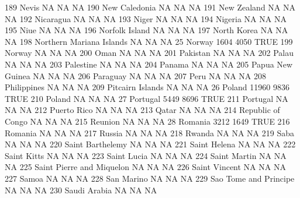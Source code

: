 \documentclass [a4paper] {article}
\begin{document}
\begin{Schunk}
\begin{Soutput}
189                               Nevis    NA    NA   NA
190                       New Caledonia    NA    NA   NA
191                         New Zealand    NA    NA   NA
192                           Nicaragua    NA    NA   NA
193                               Niger    NA    NA   NA
194                             Nigeria    NA    NA   NA
195                                Niue    NA    NA   NA
196                      Norfolk Island    NA    NA   NA
197                         North Korea    NA    NA   NA
198            Northern Mariana Islands    NA    NA   NA
25                               Norway  1604  4050 TRUE
199                              Norway    NA    NA   NA
200                                Oman    NA    NA   NA
201                            Pakistan    NA    NA   NA
202                               Palau    NA    NA   NA
203                           Palestine    NA    NA   NA
204                              Panama    NA    NA   NA
205                    Papua New Guinea    NA    NA   NA
206                            Paraguay    NA    NA   NA
207                                Peru    NA    NA   NA
208                         Philippines    NA    NA   NA
209                    Pitcairn Islands    NA    NA   NA
26                               Poland 11960  9836 TRUE
210                              Poland    NA    NA   NA
27                             Portugal  5449  8696 TRUE
211                            Portugal    NA    NA   NA
212                         Puerto Rico    NA    NA   NA
213                               Qatar    NA    NA   NA
214                   Republic of Congo    NA    NA   NA
215                             Reunion    NA    NA   NA
28                              Romania  3212  1649 TRUE
216                             Romania    NA    NA   NA
217                              Russia    NA    NA   NA
218                              Rwanda    NA    NA   NA
219                                Saba    NA    NA   NA
220                    Saint Barthelemy    NA    NA   NA
221                        Saint Helena    NA    NA   NA
222                         Saint Kitts    NA    NA   NA
223                         Saint Lucia    NA    NA   NA
224                        Saint Martin    NA    NA   NA
225           Saint Pierre and Miquelon    NA    NA   NA
226                       Saint Vincent    NA    NA   NA
227                               Samoa    NA    NA   NA
228                          San Marino    NA    NA   NA
229               Sao Tome and Principe    NA    NA   NA
230                        Saudi Arabia    NA    NA   NA

\end{Soutput}
\end{Schunk}
\end{document}
